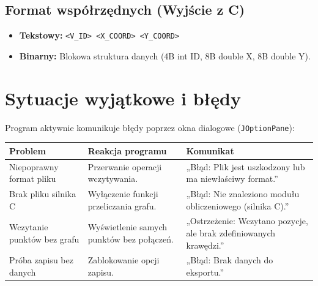 \documentclass[12pt, a4paper]{article}
\begin{document}
\subsection{Format współrzędnych (Wyjście z C)}
\begin{itemize}
    \item \textbf{Tekstowy:} \texttt{<V\_ID> <X\_COORD> <Y\_COORD>}
    \item \textbf{Binarny:} Blokowa struktura danych (4B int ID, 8B double X, 8B double Y).
\end{itemize}

\section{Sytuacje wyjątkowe i błędy}
Program aktywnie komunikuje błędy poprzez okna dialogowe (\texttt{JOptionPane}):

\begin{table}[H]
\centering
\small
\begin{tabularx}{\textwidth}{|l|X|X|}
\hline
\textbf{Problem} & \textbf{Reakcja programu} & \textbf{Komunikat} \\ \hline
Niepoprawny format pliku & Przerwanie operacji wczytywania. & „Błąd: Plik jest uszkodzony lub ma niewłaściwy format.” \\ \hline
Brak pliku silnika C & Wyłączenie funkcji przeliczania grafu. & „Błąd: Nie znaleziono modułu obliczeniowego (silnika C).” \\ \hline
Wczytanie punktów bez grafu & Wyświetlenie samych punktów bez połączeń. & „Ostrzeżenie: Wczytano pozycje, ale brak zdefiniowanych krawędzi.” \\ \hline
Próba zapisu bez danych & Zablokowanie opcji zapisu. & „Błąd: Brak danych do eksportu.” \\ \hline
\end{tabularx}
\end{table}
\end{document}
